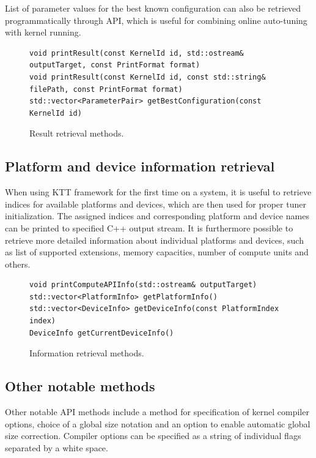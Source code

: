 \documentclass
[
    digital, %
    oneside, %
    table, %
    nolof, %
    nolot, %
    nocover %
]{fithesis3}
\begin{document}
List of parameter values for the best known configuration can also be retrieved programmatically through API, which is useful for combining online
auto-tuning with kernel running.

\begin{figure}
\begin{adjustwidth}{-1cm}{-1cm}
\begin{lstlisting}
void printResult(const KernelId id, std::ostream& outputTarget, const PrintFormat format)
void printResult(const KernelId id, const std::string& filePath, const PrintFormat format)
std::vector<ParameterPair> getBestConfiguration(const KernelId id)
\end{lstlisting}
\caption{Result retrieval methods.}
\label{ktt-result-methods}
\end{adjustwidth}
\end{figure}

\subsection{Platform and device information retrieval}
When using KTT framework for the first time on a system, it is useful to retrieve indices for available platforms and devices, which are then used for
proper tuner initialization. The assigned indices and corresponding platform and device names can be printed to specified C++ output stream. It is
furthermore possible to retrieve more detailed information about individual platforms and devices, such as list of supported extensions, memory
capacities, number of compute units and others.

\begin{figure}
\begin{adjustwidth}{-1cm}{-1cm}
\begin{lstlisting}
void printComputeAPIInfo(std::ostream& outputTarget)
std::vector<PlatformInfo> getPlatformInfo()
std::vector<DeviceInfo> getDeviceInfo(const PlatformIndex index)
DeviceInfo getCurrentDeviceInfo()
\end{lstlisting}
\caption{Information retrieval methods.}
\label{ktt-information-methods}
\end{adjustwidth}
\end{figure}

\subsection{Other notable methods}
Other notable API methods include a method for specification of kernel compiler options, choice of a global size notation and an option to enable
automatic global size correction. Compiler options can be specified as a string of individual flags separated by a white space.
\end{document}
